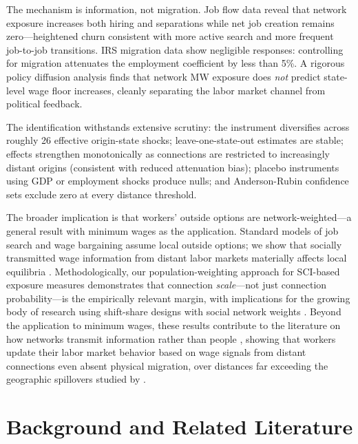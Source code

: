 \documentclass[12pt]{article}
\begin{document}
The mechanism is information, not migration. Job flow data reveal that network exposure increases both hiring and separations while net job creation remains zero---heightened churn consistent with more active search and more frequent job-to-job transitions. IRS migration data show negligible responses: controlling for migration attenuates the employment coefficient by less than 5\%. A rigorous policy diffusion analysis finds that network MW exposure does \textit{not} predict state-level wage floor increases, cleanly separating the labor market channel from political feedback.

The identification withstands extensive scrutiny: the instrument diversifies across roughly 26 effective origin-state shocks; leave-one-state-out estimates are stable; effects strengthen monotonically as connections are restricted to increasingly distant origins (consistent with reduced attenuation bias); placebo instruments using GDP or employment shocks produce nulls; and Anderson-Rubin confidence sets exclude zero at every distance threshold.

The broader implication is that workers' outside options are network-weighted---a general result with minimum wages as the application. Standard models of job search and wage bargaining assume local outside options; we show that socially transmitted wage information from distant labor markets materially affects local equilibria \citep{jager2024worker}. Methodologically, our population-weighting approach for SCI-based exposure measures demonstrates that connection \textit{scale}---not just connection probability---is the empirically relevant margin, with implications for the growing body of research using shift-share designs with social network weights \citep{bailey2018social, bailey2018house, chetty2022social}. Beyond the application to minimum wages, these results contribute to the literature on how networks transmit information rather than people \citep{kramarz2023, faberman2022}, showing that workers update their labor market behavior based on wage signals from distant connections even absent physical migration, over distances far exceeding the geographic spillovers studied by \citet{dube2014designing}.


\section{Background and Related Literature}
\label{sec:background}
\end{document}

